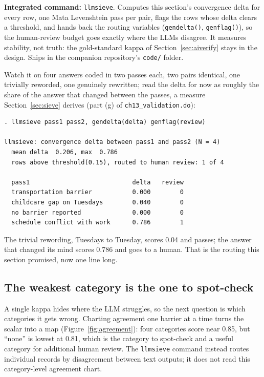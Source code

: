 \documentclass[
    a4paper,
    fontsize=10pt,
    twoside=true,
    numbers=noenddot,
]{kaobook}
\begin{document}
\begin{kaobox}[frametitle=Package Integration: \texttt{llmsieve}]
\textbf{Integrated command:} \texttt{llmsieve}. Computes this section's convergence delta for every row, one Mata Levenshtein pass per pair, flags the rows whose delta clears a threshold, and hands back the routing variables (\texttt{gendelta()}, \texttt{genflag()}), so the human-review budget goes exactly where the LLMs disagree. It measures stability, not truth: the gold-standard kappa of Section~\ref{sec:aiverify} stays in the design. Ships in the companion repository's \texttt{code/} folder.
\end{kaobox}

Watch it on four answers coded in two passes each, two pairs identical, one trivially reworded, one genuinely rewritten; read the delta for now as roughly the share of the answer that changed between the passes, a measure Section~\ref{sec:sieve} derives (part (g) of \texttt{ch13\_validation.do}):
\par
{\footnotesize
\begin{verbatim}
. llmsieve pass1 pass2, gendelta(delta) genflag(review)

llmsieve: convergence delta between pass1 and pass2 (N = 4)
  mean delta  0.206, max  0.786
  rows above threshold(0.15), routed to human review: 1 of 4

  pass1                            delta   review
  transportation barrier           0.000        0
  childcare gap on Tuesdays        0.040        0
  no barrier reported              0.000        0
  schedule conflict with work      0.786        1
\end{verbatim}
}
The trivial rewording, Tuesdays to Tuesday, scores 0.04 and passes; the answer that changed its mind scores 0.786 and goes to a human. That is the routing this section promised, now one line long.

\subsection{The weakest category is the one to spot-check}\label{sec:kappa-by-category}
A single kappa hides where the LLM struggles, so the next question is which categories it gets wrong. Charting agreement one barrier at a time turns the scalar into a map (Figure~\ref{fig:agreement}): four categories score near 0.85, but \enquote{none} is lowest at 0.81, which is the category to spot-check and a useful category for additional human review. The \texttt{llmsieve} command instead routes individual records by disagreement between text outputs; it does not read this category-level agreement chart.
\end{document}

